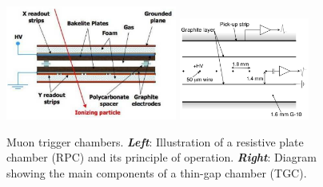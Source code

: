 \begin{figure}[!htb]
    \begin{center}
        \includegraphics[width=0.5\textwidth]{figures/chapter2/muon_spec/rpc_chamber}
        \includegraphics[width=0.38\textwidth]{figures/chapter2/muon_spec/tgc_chamber}
        \caption{
            Muon trigger chambers.
            \textbf{\textit{Left}}: Illustration of a resistive plate chamber (RPC) and its principle of operation.
            \textbf{\textit{Right}}: Diagram showing the main components of a thin-gap chamber (TGC).
        }
        \label{fig:muon_trigger_chamber}
    \end{center}
\end{figure}
